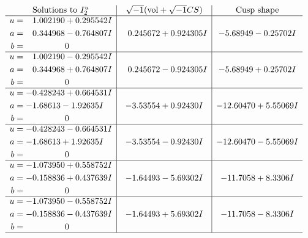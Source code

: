 \documentclass[1p]{elsarticle_modified}
\theoremstyle{definition}
\newcommand{\I}{\sqrt{-1}}
\begin{document}
$$\begin{array}{c|c|c}  
\text{Solutions to }I^u_{2}& \I (\text{vol} + \sqrt{-1}CS) & \text{Cusp shape}\\
 \hline 
\begin{aligned}
u &= \phantom{-}1.002190 + 0.295542 I \\
a &= \phantom{-}0.344968 - 0.764807 I \\
b &= \phantom{-0.000000 } 0\end{aligned}
 & \phantom{-}0.245672 + 0.924305 I & -5.68949 - 0.25702 I \\ \hline\begin{aligned}
u &= \phantom{-}1.002190 - 0.295542 I \\
a &= \phantom{-}0.344968 + 0.764807 I \\
b &= \phantom{-0.000000 } 0\end{aligned}
 & \phantom{-}0.245672 - 0.924305 I & -5.68949 + 0.25702 I \\ \hline\begin{aligned}
u &= -0.428243 + 0.664531 I \\
a &= -1.68613 - 1.92635 I \\
b &= \phantom{-0.000000 } 0\end{aligned}
 & -3.53554 + 0.92430 I & -12.60470 + 5.55069 I \\ \hline\begin{aligned}
u &= -0.428243 - 0.664531 I \\
a &= -1.68613 + 1.92635 I \\
b &= \phantom{-0.000000 } 0\end{aligned}
 & -3.53554 - 0.92430 I & -12.60470 - 5.55069 I \\ \hline\begin{aligned}
u &= -1.073950 + 0.558752 I \\
a &= -0.158836 + 0.437639 I \\
b &= \phantom{-0.000000 } 0\end{aligned}
 & -1.64493 - 5.69302 I & -11.7058 + 8.3306 I \\ \hline\begin{aligned}
u &= -1.073950 - 0.558752 I \\
a &= -0.158836 - 0.437639 I \\
b &= \phantom{-0.000000 } 0\end{aligned}
 & -1.64493 + 5.69302 I & -11.7058 - 8.3306 I\\
 \hline 
 \end{array}$$\newpage\newpage\renewcommand{\arraystretch}{1}
\end{document}
